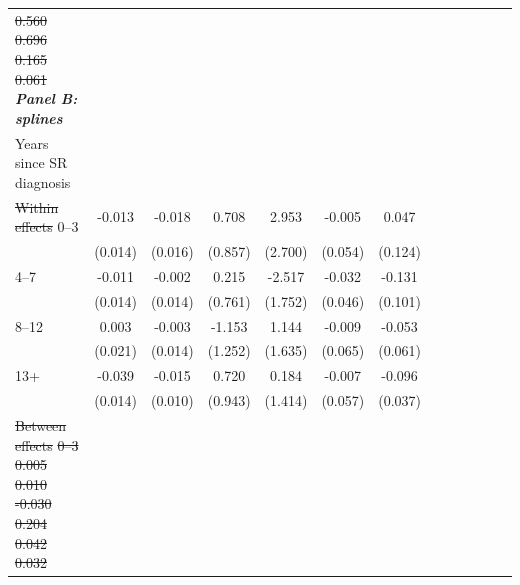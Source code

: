 \documentclass[12pt,english]{article}
\providecommand{\DIFdeltex}[1]{{\protect\color{red}\sout{#1}}}                      %
\providecommand{\DIFdelFL}[1]{\DIFdel{#1}} %
\providecommand{\DIFdelbeginFL}{} %
\providecommand{\DIFdelendFL}{} %
\providecommand{\DIFdel}[1]{\texorpdfstring{\DIFdeltex{#1}}{}} %
\begin{document}
\begin{table}[!ht]
\begin{center}
\begin{adjustbox}{max width=.9\linewidth}
\begin{threeparttable}
{\begin{tabular}{l*{6}{S S}}
\DIFdelFL{0.560         }%
\DIFdelFL{0.696         }%
\DIFdelFL{0.165         }%
\DIFdelFL{0.061         }%
\DIFdelendFL \textit{\textbf{Panel B: splines}} &&&&&&\\
						Years since SR diagnosis  &&&&&&\\
						\DIFdelbeginFL \DIFdelFL{Within effects}%
\DIFdelendFL 0--3 &    -0.013         &   -0.018         &    0.708         &    2.953         &   -0.005         &    0.047         \\
						&  (0.014)         &  (0.016)         &  (0.857)         &  (2.700)         &  (0.054)         &  (0.124)         \\
						4--7 &    -0.011         &   -0.002         &    0.215         &   -2.517         &   -0.032         &   -0.131         \\
						&  (0.014)         &  (0.014)         &  (0.761)         &  (1.752)         &  (0.046)         &  (0.101)         \\
						8--12 &    0.003         &   -0.003         &   -1.153         &    1.144         &   -0.009         &   -0.053         \\
						&  (0.021)         &  (0.014)         &  (1.252)         &  (1.635)         &  (0.065)         &  (0.061)         \\
						13+ &    -0.039\sym{***}&   -0.015         &    0.720         &    0.184         &   -0.007         &   -0.096\sym{***}\\
						&  (0.014)         &  (0.010)         &  (0.943)         &  (1.414)         &  (0.057)         &  (0.037)         \\
						\DIFdelbeginFL \DIFdelFL{Between effects}%
\DIFdelFL{0--3 }%
\DIFdelFL{0.005         }%
\DIFdelFL{0.010         }%
\DIFdelFL{-0.030         }%
\DIFdelFL{0.204         }%
\DIFdelFL{0.042}%
\DIFdelFL{0.032         }%

\end{tabular}}
\end{threeparttable}
\end{adjustbox}
\end{center}
\end{table}
\end{document}
